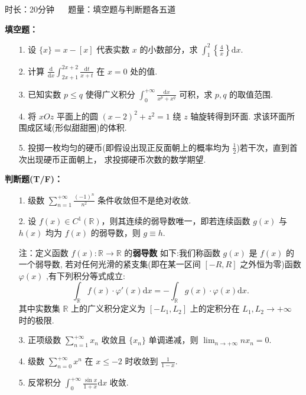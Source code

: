 \newenvironment{solution}{\begin{proofc}[解答]}{\end{proofc}}

时长：20分钟 $\quad$ 题量：填空题与判断题各五道

\textbf{填空题：}\\
    \begin{enumerate}
        \item[1.]设 $\{x\}=x-\left[ x \right]$ 代表实数 $x$ 的小数部分，求
        $\displaystyle \int_{1}^2\left\{ \frac{4}{x} \right\}\mathrm{d}x$.
        \item[2.]计算 $\displaystyle \frac{\mathrm{d}}{\mathrm{d}x}\int_{2x+1}^{2x+2}\frac{\mathrm{d}t}{x+t}$ 
        在 $x=0$ 处的值.
        \item[3.]已知实数 $\displaystyle p\leq q$ 使得广义积分 $\displaystyle \int_{0}^{+\infty}\frac{\mathrm{d}x}{x^p+x^q}$ 可积，求 $p,q$ 的取值范围.
        \item[4.]将 $xOz$ 平面上的圆 $\displaystyle (x-2)^2+z^2=1$ 绕 $z$ 轴旋转得到环面. 求该环面所围成区域(形似甜甜圈)的体积.
        \item[5.]投掷一枚均匀的硬币(即假设出现正反面朝上的概率均为 $\displaystyle \frac{1}{2}$)若干次，直到首次出现硬币正面朝上，
        求投掷硬币次数的数学期望.
    \end{enumerate}
\textbf{判断题(T/F)：}\\
    \begin{enumerate}
        \item[1.]级数 $\displaystyle \sum_{n=1}^{+\infty}\frac{(-1)^n}{n^2}$ 条件收敛但不是绝对收敛.
        \item[2.]设 $\displaystyle f(x)\in C^1(\mathbb{R})$，则其连续的弱导数唯一，即若连续函数 $g(x)$ 与 $h(x)$ 均为
        $f(x)$ 的弱导数，则 $g\equiv h$.

        注：定义函数 \(\displaystyle f(x):\mathbb{R}\to \mathbb{R}\) 的\textbf{弱导数} 如下:我们称函数 \(g(x)\) 是 \(f(x)\) 的一个弱导数,
        若对任何光滑的紧支集(即在某一区间 \([-R,R]\) 之外恒为零)函数 \(\varphi (x)\) ,有下列积分等式成立:
        \[\displaystyle \int_{\mathbb{R}}f(x)\cdot \varphi '(x)\mathrm{d}x = -\int_{\mathbb{R}}g(x)\cdot \varphi (x)\mathrm{d}x.\]
        其中实数集 \(\mathbb{R}\) 上的广义积分定义为 \(\displaystyle[- L_{1},L_{2}]\) 上的定积分在 \(\displaystyle L_{1},L_{2}\to +\infty\) 时的极限. 
        \item[3.]正项级数 $\displaystyle \sum_{n=1}^{+\infty} x_n$ 收敛且 $\{x_n\}$ 单调递减，则 $\displaystyle \lim_{n\to+\infty}nx_n=0$.
        \item[4.]级数 $\displaystyle \sum_{n=0}^{+\infty}x^n$ 在 $x\leq -2$ 时收敛到 $\displaystyle \frac{1}{1-x}$.
        \item[5.]反常积分 $\displaystyle \int_{0}^{+\infty}\frac{\sin{x}}{1+x}\mathrm{d}x$ 收敛.
    \end{enumerate}

